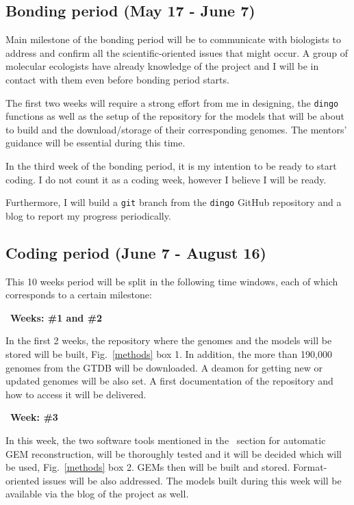 \documentclass{article}
\begin{document}
\subsection{Bonding period (May 17 - June 7)}
Main milestone of the bonding period will be to communicate with biologists 
to address and confirm all the scientific-oriented issues that might occur. 
A group of molecular ecologists have already knowledge of the project and I will be in 
contact with them even before bonding period starts. 

The first two weeks will require a strong effort from me 
in designing, the \texttt{dingo} functions as well as the setup of
the repository for the models that will be about to build and 
the download/storage of their corresponding genomes. 
The mentors’ guidance will be essential during this time. 

In the third week of the bonding period, it is my intention to be ready to start coding. 
I do not count it as a coding week, however I believe I will be ready.

Furthermore, I will build a \texttt{git} branch from the \texttt{dingo} GitHub repository
and a blog to report my progress periodically.




\subsection{Coding period (June 7 - August 16)}

This 10 weeks period will be split in the following time windows, each of which corresponds to a certain milestone: 


\textbullet\ \textbf{Weeks: \#1 and \#2}

In the first 2 weeks, the repository where the genomes and the models will be stored will be built, Fig.~\ref{methods} box 1. 
In addition, the more than 190,000 genomes from the GTDB will be downloaded. 
A deamon for getting new or updated genomes will be also set.
A first documentation of the repository and how to access it will be delivered.

\textbullet\ \textbf{Week: \#3}

In this week, the two software tools mentioned in the~\pageref{methodology} section for automatic GEM reconstruction, will be thoroughly tested and it will be decided which 
will be used, Fig.~\ref{methods} box 2. 
GEMs then will be built and stored. 
Format-oriented issues will be also addressed.  
The models built during this week will be available via the blog of the project as well. 
\end{document}
